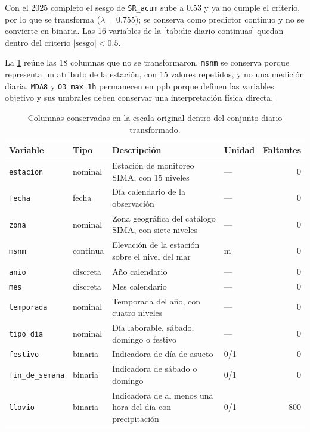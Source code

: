 Con el 2025 completo el sesgo de \texttt{SR\_acum} sube a 0.53 y ya no
cumple el criterio, por lo que se transforma ($\lambda=0.755$); se conserva
como predictor continuo y no se convierte en binaria. Las 16 variables de la
\cref{tab:dic-diario-continuas} quedan dentro del criterio
$|\mathrm{sesgo}|<0.5$.

La \cref{tab:dic-diario-originales} reúne las 18 columnas que no se
transformaron. \texttt{msnm} se conserva porque representa un atributo de la
estación, con 15 valores repetidos, y no una medición diaria. \texttt{MDA8} y
\texttt{O3\_max\_1h} permanecen en ppb porque definen las variables objetivo y
sus umbrales deben conservar una interpretación física directa.

\begin{table}[pos=t]
  \centering
  \caption{Columnas conservadas en la escala original dentro del conjunto
    diario transformado.}
  \label{tab:dic-diario-originales}
  \footnotesize
  \setlength{\tabcolsep}{4pt}
  \begin{tabular}{llp{8.0cm}lr}
    \toprule
    Variable & Tipo & Descripción & Unidad & Faltantes \\
    \midrule
    \texttt{estacion} & nominal & Estación de monitoreo SIMA, con 15 niveles
      & --- & 0 \\
    \texttt{fecha} & fecha & Día calendario de la observación
      & --- & 0 \\
    \texttt{zona} & nominal & Zona geográfica del catálogo SIMA, con siete
      niveles & --- & 0 \\
    \texttt{msnm} & continua & Elevación de la estación sobre el nivel del mar
      & m & 0 \\
    \texttt{anio} & discreta & Año calendario
      & --- & 0 \\
    \texttt{mes} & discreta & Mes calendario
      & --- & 0 \\
    \texttt{temporada} & nominal & Temporada del año, con cuatro niveles
      & --- & 0 \\
    \texttt{tipo\_dia} & nominal & Día laborable, sábado, domingo o festivo
      & --- & 0 \\
    \texttt{festivo} & binaria & Indicadora de día de asueto
      & 0/1 & 0 \\
    \texttt{fin\_de\_semana} & binaria & Indicadora de sábado o domingo
      & 0/1 & 0 \\
    \texttt{llovio} & binaria & Indicadora de al menos una hora del día con
      precipitación & 0/1 & 800 \\

\end{tabular}
\end{table}
